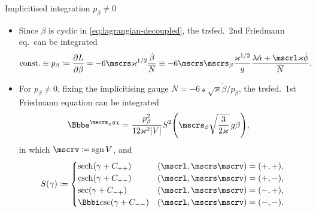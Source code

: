 \documentclass[9pt]{beamer}
\begin{document}
\begin{frame}%
{Implicitised integration}%
{$p_\beta \neq 0$}
\begin{itemize}
\item Since $\beta$ is cyclic in \cref{eq:lagrangian-decoupled},
the trsfed.\ 2nd Friedmann eq.\ can be integrated
\begin{align}
\text{const.} \equiv p_\beta \coloneqq \frpa{L}{\dot{\beta}} &=
-6\mscrs\varkappa^{1/2}\frac{\dot{\beta}}{\overline{N}}
\equiv
-6\mscrs\mscrs_\beta\frac{\varkappa^{1/2}}{g}
\frac{\lambda\dot{\alpha}+\mscrl\varkappa\dot{\phi}}{\overline{N}}.
\end{align}

\item For $p_\beta \neq 0$, fixing the \alert{implicitising gauge}
$\overline{N} = -6\mscrs\sqrt{\varkappa}\dot{\beta}/p_\beta$, the trsfed.\
1st Friedmann equation can be integrated
\begin{align}
\ee^{\mscrs_\chi g\chi} &=
\frac{p_\beta^2}{12\varkappa^2\vbr{V}}
\rfun{S^2}{\mscrs_\beta \sqrt{\frac{3}{2\varkappa}}\,g \beta},
\end{align}
in which $\mscrv \coloneqq \sgn V$, and
\begin{align}
\rfun{S}{\gamma} \coloneqq
\begin{cases}
\rfun{\sech}{\gamma+C_{++}} & \rbr{\mscrl, \mscrs\mscrv} = \rbr{+,+}, \\
\rfun{\csch}{\gamma+C_{+-}} & \rbr{\mscrl, \mscrs\mscrv} = \rbr{+,-}, \\
\rfun{\sec}{\gamma+C_{-+}} & \rbr{\mscrl, \mscrs\mscrv} = \rbr{-,+}, \\
\ii\rfun{\csc}{\gamma+C_{--}} & \rbr{\mscrl, \mscrs\mscrv} = \rbr{-,-}. \\
\end{cases}
\end{align}
\end{itemize}
\end{frame}
\end{document}
